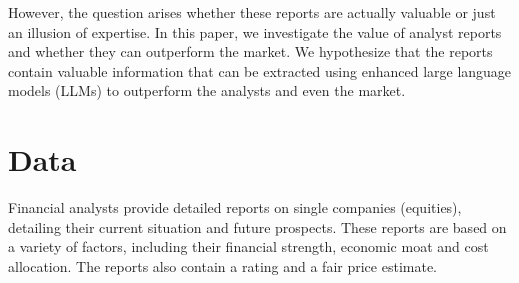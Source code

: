 \documentclass[conference]{IEEEtran}
\begin{document}
However, the question arises whether these reports are actually valuable or just an illusion of expertise. In this paper, we investigate the value of analyst reports and whether they can outperform the market. We hypothesize that the reports contain valuable information that can be extracted using enhanced large language models (LLMs) to outperform the analysts and even the market.
\section{Data} %
Financial analysts provide detailed reports on single companies (equities), detailing their current situation and future prospects. These reports are based on a variety of factors, including their financial strength, economic moat and cost allocation. The reports also contain a rating and a fair price estimate. 
\end{document}
